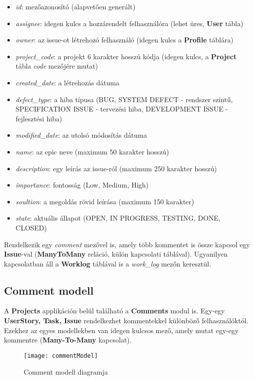 \begin{itemize}
	\item \textit{id}: mezőazonosító (alapvetően generált)
	\item \textit{assignee}: idegen kulcs a hozzárendelt felhasználóra (lehet üres, \textbf{User} tábla)
	\item \textit{owner}: az issue-ot létrehozó felhasználó (idegen kulcs a \textbf{Profile} táblára)
	\item \textit{project\_code}: a projekt 6 karakter hosszú kódja (idegen kulcs, a \textbf{Project} tábla \textit{code} mezőjére mutat)
	\item \textit{created\_date}: a létrehozás dátuma
	\item \textit{defect\_type}: a hiba típusa (BUG, SYSTEM DEFECT - rendszer szintű, SPECIFICATION ISSUE - tervezési hiba, DEVELOPMENT ISSUE - fejlesztési hiba)
	\item \textit{modified\_date}: az utolsó módosítás dátuma
	\item \textit{name}: az epic neve (maximum 50 karakter hosszú)
	\item \textit{description}: egy leírás az issue-ról (maximum 250 karakter hosszú)
	\item \textit{importance}: fontosság (Low, Medium, High)
	\item \textit{soultion}: a megoldás rövid leírása (maximum 150 karakter)
	\item \textit{state}: aktuális állapot (OPEN, IN PROGRESS, TESTING, DONE, CLOSED)
\end{itemize}

Rendelkezik egy \textit{comment} mezővel is, amely több kommentet is össze kapcsol egy \textbf{Issue}-val (\textbf{ManyToMany} reláció, külön kapcsolati táblával). Ugyanilyen kapcsolatban áll a \textbf{Worklog} táblával is a \textit{work\_log} mezőn keresztül.

\subsection{Comment modell}

A \textbf{Projects} applikáción belül található a \textbf{Comments} modul is. Egy-egy \textbf{UserStory, Task, Issue} rendelkezhet kommentekkel különböző felhasználóktól. Ezekhez az egyes modellekben van idegen kulcsos mező, amely mutat egy-egy kommentre (\textbf{Many-To-Many} kapcsolat). 

\begin{figure}[H]
	\centering
	\texttt{[image: commentModel]}
	\caption{Comment modell diagramja}
	\label{fig:commentModel}
\end{figure}


